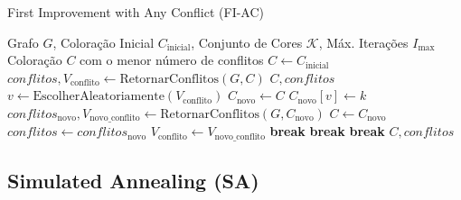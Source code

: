 \documentclass[12pt,a4paper]{article}
\begin{document}
\begin{algorithm}
\caption{First Improvement with Any Conflict (FI-AC)}
\label{alg:fi_ac}
\begin{algorithmic}[1]
\REQUIRE Grafo $G$, Coloração Inicial $C_{\text{inicial}}$, Conjunto de Cores $\mathcal{K}$, Máx. Iterações $I_{\max}$
\ENSURE Coloração $C$ com o menor número de conflitos
\STATE $C \gets C_{\text{inicial}}$
\STATE $conflitos, V_{\text{conflito}} \gets \text{RetornarConflitos}(G, C)$
    \RETURN $C, conflitos$
\ENDIF
{}
    \STATE $v \gets \text{EscolherAleatoriamente}(V_{\text{conflito}})$
        \STATE $C_{\text{novo}} \gets C$
        \STATE $C_{\text{novo}}[v] \gets k$
        \STATE $conflitos_{\text{novo}}, V_{\text{novo\_conflito}} \gets \text{RetornarConflitos}(G, C_{\text{novo}})$
            \STATE $C \gets C_{\text{novo}}$
            \STATE $conflitos \gets conflitos_{\text{novo}}$
            \STATE $V_{\text{conflito}} \gets V_{\text{novo\_conflito}}$
                \STATE \textbf{break} 
            \ENDIF
            \STATE \textbf{break} 
        \ENDIF
    \ENDFOR
        \STATE \textbf{break}
    \ENDIF
\ENDFOR
\RETURN $C, conflitos$
\end{algorithmic}
\end{algorithm}

\subsection{Simulated Annealing (SA)}
\end{document}
